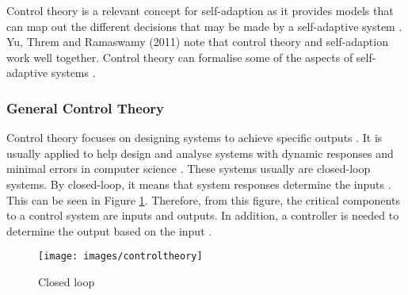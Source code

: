 Control theory is a relevant concept for self-adaption as it
provides models that can map out the different decisions that may be
made by a self-adaptive system \cite{diao2005control}. Yu, Threm and
Ramaswamy (2011) note that control theory and self-adaption work
well together. Control theory can formalise some of
the aspects of self-adaptive systems \cite{yu2011toward}.
\subsubsection{General Control Theory}
Control theory focuses on designing systems to achieve specific
outputs \cite{Michels2006}. It is usually
applied to help design and analyse systems with dynamic responses and
minimal errors in computer science \cite{simrock2008control}. These systems
usually are closed-loop systems. By closed-loop, it means that system responses
determine the inputs \cite{simrock2008control}. This can be seen in Figure \ref{fig:closedloop}. Therefore, from this figure, the critical components to a control system
are inputs and outputs. In addition, a controller is needed to
determine the output based on the input \cite{simrock2008control}.
\begin{figure}
    \centering
    \texttt{[image: images/controltheory]}
    \caption{Closed loop }
    \label{fig:closedloop}
\end{figure}
